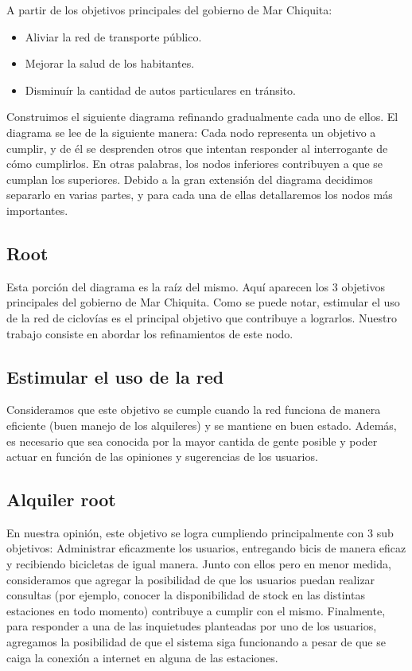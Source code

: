 A partir de los objetivos principales del gobierno de Mar Chiquita:
\begin{itemize}
\item Aliviar la red de transporte público.
\item Mejorar la salud de los habitantes.
\item Disminuír la cantidad de autos particulares en tránsito. 
\end{itemize}

Construimos el siguiente diagrama refinando gradualmente cada uno de ellos. El diagrama se lee de la siguiente manera:
Cada nodo representa un objetivo a cumplir, y de él se desprenden otros que intentan responder al interrogante de cómo cumplirlos. En otras palabras, los nodos inferiores contribuyen a que se cumplan los superiores.
Debido a la gran extensión del diagrama decidimos separarlo en varias partes, y para cada una de ellas detallaremos los 
nodos más importantes.

\subsection{Root}

Esta porción del diagrama es la raíz del mismo. Aquí aparecen los 3 objetivos principales del gobierno de Mar Chiquita.
Como se puede notar, estimular el uso de la red de ciclovías es el principal objetivo que contribuye a lograrlos.
Nuestro trabajo consiste en abordar los refinamientos de este nodo.

\subsection{Estimular el uso de la red}

Consideramos que este objetivo se cumple cuando la red funciona de manera eficiente (buen manejo de los
alquileres) y se mantiene en buen estado. Además, es necesario que sea conocida por la mayor cantida de gente
posible y poder actuar en función de las opiniones y sugerencias de los usuarios.

\subsection{Alquiler root}

En nuestra opinión, este objetivo se logra cumpliendo principalmente con 3 sub objetivos:
Administrar eficazmente los usuarios, entregando bicis de manera eficaz y recibiendo bicicletas de igual
manera. 
Junto con ellos pero en menor medida, consideramos que agregar la posibilidad de que los usuarios puedan realizar consultas
(por ejemplo, conocer la disponibilidad de stock en las distintas estaciones en todo momento) contribuye a cumplir con el mismo.
Finalmente, para responder a una de las inquietudes planteadas por uno de los usuarios, agregamos la posibilidad de que el 
sistema siga funcionando a pesar de que se caiga la conexión a internet en alguna de las estaciones.

